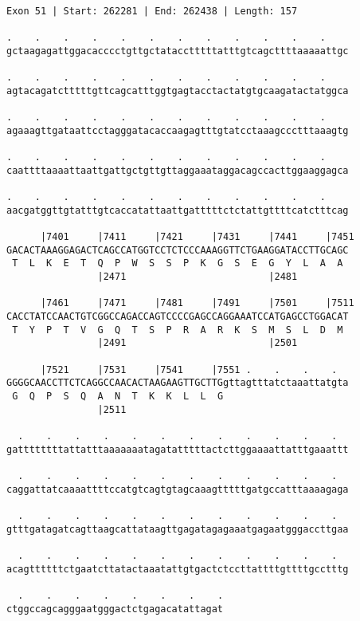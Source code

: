 \documentclass{article}
\begin{document}
\begin{Verbatim}
Exon 51 | Start: 262281 | End: 262438 | Length: 157
 
.    .    .    .    .    .    .    .    .    .    .    .    
gctaagagattggacacccctgttgctatacctttttatttgtcagcttttaaaaattgc
  
.    .    .    .    .    .    .    .    .    .    .    .    
agtacagatctttttgttcagcatttggtgagtacctactatgtgcaagatactatggca
  
.    .    .    .    .    .    .    .    .    .    .    .    
agaaagttgataattcctagggatacaccaagagtttgtatcctaaagccctttaaagtg
  
.    .    .    .    .    .    .    .    .    .    .    .    
caattttaaaattaattgattgctgttgttaggaaataggacagccacttggaaggagca
  
.    .    .    .    .    .    .    .    .    .    .    .    
aacgatggttgtatttgtcaccatattaattgatttttctctattgttttcatctttcag
  
      |7401     |7411     |7421     |7431     |7441     |7451
GACACTAAAGGAGACTCAGCCATGGTCCTCTCCCAAAGGTTCTGAAGGATACCTTGCAGC
 T  L  K  E  T  Q  P  W  S  S  P  K  G  S  E  G  Y  L  A  A 
                |2471                         |2481         
  
      |7461     |7471     |7481     |7491     |7501     |7511
CACCTATCCAACTGTCGGCCAGACCAGTCCCCGAGCCAGGAAATCCATGAGCCTGGACAT
 T  Y  P  T  V  G  Q  T  S  P  R  A  R  K  S  M  S  L  D  M 
                |2491                         |2501         
  
      |7521     |7531     |7541     |7551 .    .    .    .  
GGGGCAACCTTCTCAGGCCAACACTAAGAAGTTGCTTGgttagtttatctaaattatgta
 G  Q  P  S  Q  A  N  T  K  K  L  L  G                      
                |2511                                       
  
  .    .    .    .    .    .    .    .    .    .    .    .  
gattttttttattatttaaaaaaatagatatttttactcttggaaaattatttgaaattt
  
  .    .    .    .    .    .    .    .    .    .    .    .  
caggattatcaaaattttccatgtcagtgtagcaaagtttttgatgccatttaaaagaga
  
  .    .    .    .    .    .    .    .    .    .    .    .  
gtttgatagatcagttaagcattataagttgagatagagaaatgagaatgggaccttgaa
  
  .    .    .    .    .    .    .    .    .    .    .    .  
acagttttttctgaatcttatactaaatattgtgactctccttattttgttttgcctttg
  
  .    .    .    .    .    .    .    .
ctggccagcagggaatgggactctgagacatattagat
\end{Verbatim}
\end{document}
